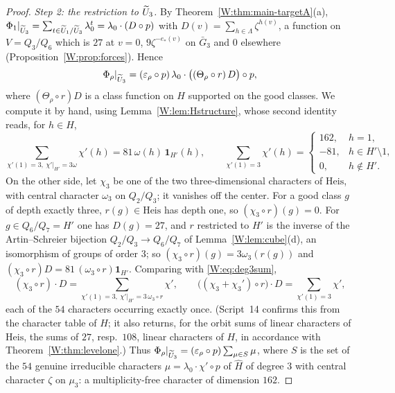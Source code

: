 \begin{proof}
\emph{Step 2: the restriction to $\widetilde U_3$.}  By
Theorem~\ref{W:thm:main-targetA}(a), $\Phi_1|_{\widetilde U_3}=\sum_{t\in\widetilde U_1/\widetilde U_3}\lambda_0^t=\lambda_0\cdot(D\circ p)$
with $D(v)=\sum_{h\in\Lambda}\zeta^{h(v)}$, a function on $V=Q_3/Q_6$
which is $27$ at $v=0$, $9\zeta^{-e_*(v)}$ on $\bar G_3$ and $0$
elsewhere (Proposition~\ref{W:prop:forces}).  Hence
\[
 \Phi_\rho|_{\widetilde U_3}=(\varepsilon_\rho\circ p)\,\lambda_0\cdot\bigl((\Theta_\rho\circ r)\,D\bigr)\circ p ,
\]
where $(\Theta_\rho\circ r)D$ is a class function on $H$ supported on
the good classes.  We compute it by hand, using
Lemma~\ref{W:lem:Hstructure}, whose second identity reads, for $h\in H$,
\begin{equation}\label{W:eq:deg3sum}
 \sum_{\chi'(1)=3,\ \chi'|_{H'}=3\omega}\chi'(h)=81\,\omega(h)\,\mathbf 1_{H'}(h),\qquad
 \sum_{\chi'(1)=3}\chi'(h)=\begin{cases}162,&h=1,\\-81,&h\in H'\setminus1,\\0,&h\notin H'.\end{cases}
\end{equation}
On the other side, let $\chi_3$ be one of the two three-dimensional
characters of $\mathrm{Heis}$, with central character $\omega_3$ on
$Q_2/Q_3$; it vanishes off the center.  For a good class $g$ of depth
exactly three, $r(g)\in\mathrm{Heis}$ has depth one, so
$(\chi_3\circ r)(g)=0$.  For $g\in Q_6/Q_7=H'$ one has $D(g)=27$, and
$r$ restricted to $H'$ is the inverse of the Artin--Schreier bijection
$Q_2/Q_3\to Q_6/Q_7$ of Lemma~\ref{W:lem:cube}(d), an isomorphism of
groups of order $3$; so $(\chi_3\circ r)(g)=3\omega_3(r(g))$ and
$(\chi_3\circ r)D=81\,(\omega_3\circ r)\mathbf 1_{H'}$.  Comparing with
\eqref{W:eq:deg3sum},
\begin{equation}\label{W:eq:chi3D}
 (\chi_3\circ r)\cdot D=\sum_{\chi'(1)=3,\ \chi'|_{H'}=3\,\omega_3\circ r}\chi',\qquad
 \bigl((\chi_3+\chi_3')\circ r\bigr)\cdot D=\sum_{\chi'(1)=3}\chi' ,
\end{equation}
each of the $54$ characters occurring exactly once.  (Script~14
confirms this from the character table of $H$; it also returns, for the
orbit sums of linear characters of $\mathrm{Heis}$, the sums of $27$,
resp.\ $108$, linear characters of $H$, in accordance with
Theorem~\ref{W:thm:levelone}.)  Thus
$\Phi_\rho|_{\widetilde U_3}=(\varepsilon_\rho\circ p)\sum_{\mu\in S}\mu$, where
$S$ is the set of the $54$ genuine irreducible characters
$\mu=\lambda_0\cdot\chi'\circ p$ of $\hat H$ of degree $3$ with central
character $\zeta$ on $\mu_3$: a multiplicity-free character of
dimension $162$.


\end{proof}
